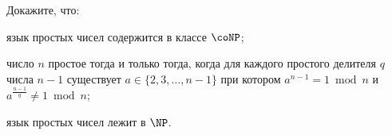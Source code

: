 Докажите, что:
\begin{enumcyr}
    \item язык простых чисел содержится в классе $\coNP$;
    \item число $n$ простое тогда и только тогда, когда для каждого простого делителя $q$ числа $n - 1$ существует $a \in
	    \{2, 3, \dots, n - 1\}$ при котором $a^{n - 1} = 1 \bmod n$ и $a^{\frac{n - 1}{q}} \neq 1 \bmod n$;
    \item язык простых чисел лежит в $\NP$.
\end{enumcyr}